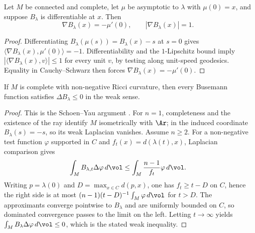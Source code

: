 \begin{lemma}
\label{lem:busemann-gradient-norm-one}

Let $M$ be connected and complete, let $\mu$ be asymptotic to $\lambda$
with $\mu(0)=x$, and suppose $B_\lambda$ is differentiable at $x$. Then
$$\nabla B_\lambda(x)=-\mu'(0),\qquad |\nabla B_\lambda(x)|=1.$$
\label{eqnBlipgrad}
\end{lemma}
\begin{proof}
\sketch
{}
Differentiating $B_\lambda(\mu(s))=B_\lambda(x)-s$ at $s=0$ gives
$\langle\nabla B_\lambda(x),\mu'(0)\rangle=-1$. Differentiability and
the $1$-Lipschitz bound imply
$|\langle\nabla B_\lambda(x),v\rangle|\le1$ for every unit $v$, by
testing along unit-speed geodesics. Equality in Cauchy--Schwarz then
forces $\nabla B_\lambda(x)=-\mu'(0)$.
\end{proof}

\begin{proposition}
\label{prop:busemann-laplacian}
\label{Blambda}


If $M$ is complete with non-negative Ricci curvature, then every
Busemann function satisfies $\Delta B_\lambda\le0$ in the weak sense.
\end{proposition}
\begin{proof}
\sketch
{}
This is the Schoen--Yau argument \cite{SchoenYau}.
For $n=1$, completeness and the existence of the ray identify $M$
isometrically with $\Ar$; in the induced coordinate
$B_\lambda(s)=-s$, so its weak Laplacian vanishes. Assume $n\ge2$.
For a non-negative test function $\varphi$ supported in $C$ and
$f_t(x)=d(\lambda(t),x)$, Laplacian comparison gives
$$\int_M B_{\lambda,t}\Delta\varphi\,d\vol
\le\int_M\frac{n-1}{f_t}\varphi\,d\vol.$$
Writing $p=\lambda(0)$ and
$D=\max_{x\in C}d(p,x)$, one has $f_t\ge t-D$ on $C$, hence the
right side is at most
$(n-1)(t-D)^{-1}\int_M\varphi\,d\vol$ for $t>D$. The approximants
converge pointwise to $B_\lambda$ and are uniformly bounded on $C$, so
dominated convergence passes to the limit on the left. Letting
$t\to\infty$ yields
$\int_M B_\lambda\Delta\varphi\,d\vol\le0$, which is the stated weak
inequality.
\end{proof}

